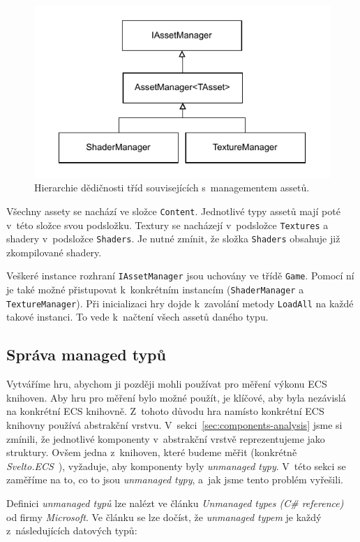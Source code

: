 \begin{figure}[!htb]
  \centering
  \includegraphics[width=0.6\linewidth]{img/asset-manager.pdf}
  \caption{Hierarchie dědičnosti tříd souvisejících s~managementem assetů.}
  \label{fig:asset-manager}
\end{figure}

Všechny assety se nachází ve složce \texttt{Content}. Jednotlivé typy assetů mají poté v~této složce svou podsložku. Textury se nacházejí v~podsložce \texttt{Textures} a shadery v~podsložce \texttt{Shaders}. Je nutné zmínit, že složka \texttt{Shaders} obsahuje již zkompilované shadery.

Veškeré instance rozhraní \texttt{IAssetManager} jsou uchovány ve třídě \texttt{Game}. Pomocí ní je také možné přistupovat k~konkrétním instancím (\texttt{ShaderManager} a \texttt{TextureManager}). Při inicializaci hry dojde k~zavolání metody \texttt{LoadAll} na každé takové instanci. To vede k~načtení všech assetů daného typu.

\subsection{Správa managed typů}
Vytváříme hru, abychom ji později mohli používat pro měření výkonu ECS knihoven. Aby hru pro měření bylo možné použít, je klíčové, aby byla nezávislá na konkrétní ECS knihovně. Z~tohoto důvodu hra namísto konkrétní ECS knihovny používá abstrakční vrstvu. V~sekci~\ref{sec:components-analysis} jsme si zmínili, že jednotlivé komponenty v~abstrakční vrstvě reprezentujeme jako struktury. Ovšem jedna z~knihoven, které budeme měřit (konkrétně \textit{Svelto.ECS}~\cite{SveltoECS}), vyžaduje, aby komponenty byly \textit{unmanaged typy}. V~této sekci se zaměříme na to, co to jsou \textit{unmanaged typy}, a~jak jsme tento problém vyřešili.

Definici \textit{unmanaged typů} lze nalézt ve článku \textit{Unmanaged types (C\# reference)}~\cite{Unmanagedtypes} od firmy \textit{Microsoft}. Ve článku se lze dočíst, že \textit{unmanaged typem} je každý z~následujících datových typů:

